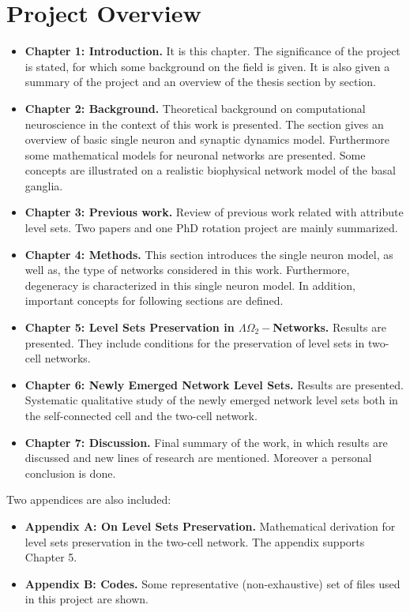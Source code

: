 \section{Project Overview}

\begin{itemize}

    \item \textbf{Chapter 1: Introduction.} It is this chapter. The significance of the project is stated, for which some background on the field is given. It is also given a summary of the project and an overview of the thesis section by section.
    
    \item \textbf{Chapter 2: Background.} Theoretical background on computational neuroscience in the context of this work is presented. The section gives an overview of basic single neuron and synaptic dynamics model. Furthermore some mathematical models for neuronal networks are presented. Some concepts are illustrated on a realistic biophysical network model of the basal ganglia.
    
    \item \textbf{Chapter 3: Previous work.} Review of previous work related with attribute level sets. Two papers and one PhD rotation project are mainly summarized. 
    
    \item \textbf{Chapter 4: Methods.} This section introduces the single neuron model, as well as, the type of networks considered in this work. Furthermore, degeneracy is characterized in this single neuron model. In addition, important concepts for following sections are defined.
    
    \item \textbf{Chapter 5: Level Sets Preservation in $\Lambda \Omega_{2}-$Networks.} Results are presented. They include conditions for the preservation of level sets in two-cell networks.
    
    \item \textbf{Chapter 6: Newly Emerged Network Level Sets.} Results are presented. Systematic qualitative study of the newly emerged network level sets both in the self-connected cell and the two-cell network.
    
    \item \textbf{Chapter 7: Discussion.} Final summary of the work, in which results are discussed and new lines of research are mentioned. Moreover a personal conclusion is done. 
    
\end{itemize}
Two appendices are also included:    
\begin{itemize}

    \item \textbf{Appendix A: On Level Sets Preservation.} Mathematical derivation for level sets preservation in the two-cell network. The appendix supports Chapter 5.
    
    \item \textbf{Appendix B: Codes.} Some representative (non-exhaustive) set of files used in this project are shown.

\end{itemize}

    

